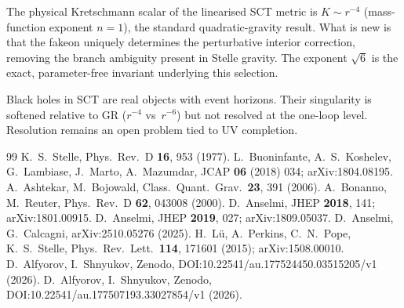 \documentclass[a4paper,12pt]{article}
\begin{document}
The physical Kretschmann scalar of the linearised SCT metric is
$K\sim r^{-4}$ (mass-function exponent $n=1$), the standard
quadratic-gravity result.
What is new is that the fakeon uniquely determines the perturbative
interior correction, removing the branch ambiguity present in Stelle
gravity.
The exponent $\sqrt{6}$ is the exact, parameter-free invariant
underlying this selection.

Black holes in SCT are real objects with event horizons.
Their singularity is softened relative to GR ($r^{-4}$ vs~$r^{-6}$)
but not resolved at the one-loop level.
Resolution remains an open problem tied to UV completion.

\begin{thebibliography}{99}
 K.~S.~Stelle, Phys.\ Rev.\ D \textbf{16}, 953 (1977).
 L.~Buoninfante, A.~S.~Koshelev, G.~Lambiase,
  J.~Marto, A.~Mazumdar, JCAP \textbf{06} (2018) 034;
  arXiv:1804.08195.
 A.~Ashtekar, M.~Bojowald,
  Class.\ Quant.\ Grav.\ \textbf{23}, 391 (2006).
 A.~Bonanno, M.~Reuter,
  Phys.\ Rev.\ D \textbf{62}, 043008 (2000).
 D.~Anselmi,
  JHEP \textbf{2018}, 141; arXiv:1801.00915.
 D.~Anselmi,
  JHEP \textbf{2019}, 027; arXiv:1809.05037.
 D.~Anselmi, G.~Calcagni,
  arXiv:2510.05276 (2025).
 H.~L\"u, A.~Perkins, C.~N.~Pope, K.~S.~Stelle,
  Phys.\ Rev.\ Lett.\ \textbf{114}, 171601 (2015); arXiv:1508.00010.
 D.~Alfyorov, I.~Shnyukov,
  Zenodo, DOI:10.22541/au.177524450.03515205/v1 (2026).
 D.~Alfyorov, I.~Shnyukov,
  Zenodo, DOI:10.22541/au.177507193.33027854/v1 (2026).
\end{thebibliography}
\end{document}
